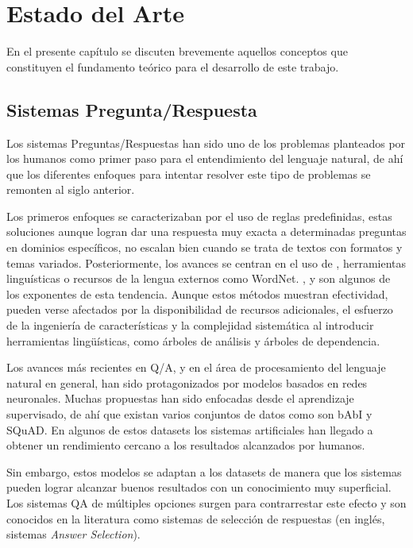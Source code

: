 \chapter{Estado del Arte}\label{chapter:background}

En el presente capítulo se discuten brevemente aquellos conceptos que constituyen el fundamento teórico para el desarrollo de este trabajo.


\section{Sistemas Pregunta/Respuesta}

Los sistemas Preguntas/Respuestas han sido uno de los problemas planteados por los humanos como primer paso para el entendimiento del lenguaje natural, de ahí que los diferentes enfoques para intentar resolver este tipo de problemas se remonten al siglo anterior.

Los primeros enfoques se caracterizaban por el uso de reglas predefinidas, estas soluciones aunque logran dar una respuesta muy exacta a determinadas preguntas en dominios específicos, no escalan bien cuando se trata de textos con formatos y temas variados. Posteriormente, los avances se centran en el uso de , herramientas linguísticas o recursos de la lengua externos como WordNet. \cite{2013-yih-lexical-semantic-model}, \cite{2013-yao-edit-distance} y \cite{2010-textual-entailment} son algunos de los exponentes de esta tendencia. Aunque estos métodos muestran efectividad, pueden verse afectados por la disponibilidad de recursos adicionales, el esfuerzo de la ingeniería de características y la complejidad sistemática al introducir herramientas lingüísticas, como árboles de análisis y árboles de dependencia. 

Los avances más recientes en Q/A, y en el área de procesamiento del lenguaje natural en general, han sido protagonizados por modelos basados en redes neuronales. Muchas propuestas han sido enfocadas desde el aprendizaje supervisado, de ahí que existan varios conjuntos de datos como son bAbI y SQuAD. En algunos de estos datasets los sistemas artificiales han llegado a obtener un rendimiento cercano a los resultados alcanzados por humanos. 

Sin embargo, estos modelos se adaptan a los datasets de manera que los sistemas pueden lograr alcanzar buenos resultados con un conocimiento muy superficial. Los sistemas QA de múltiples opciones surgen para contrarrestar este efecto y son conocidos en la literatura como sistemas de selección de respuestas (en inglés, sistemas \textit{Answer Selection}). 

